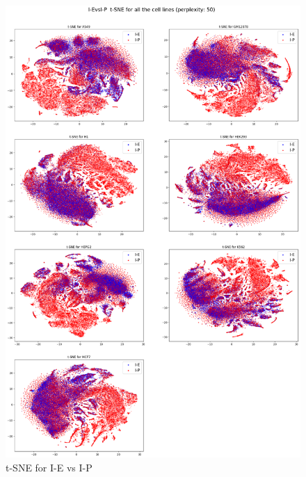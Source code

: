 \begin{figure}[h]
\centering
\includegraphics[width=12cm]{images/tsne_decomp_plots/20200410-232553_I-EvsI-P_tsne_plot.png}
\caption{t-SNE for I-E vs I-P}
\label{fig:tsneIEvsIP}
\end{figure}

